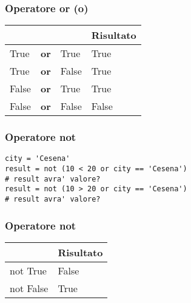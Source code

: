 \begin{frame}[fragile]
\frametitle{Operatore or (o)}

\begin{tabu} to 0.8\textwidth { | X[l] | X[c] | X[c] |  X[r] |}
 \hline
  & & & Risultato\\
 \hline
 True & \textbf{or} & True & True\\
 \hline
 True & \textbf{or} & False & True\\
 \hline
 False & \textbf{or} & True & True\\
\hline
 False & \textbf{or} & False& False\\
\hline
\end{tabu}

\end{frame}

\begin{frame}[fragile]
\frametitle{Operatore not}
    \begin{lstlisting}
city = 'Cesena'
result = not (10 < 20 or city == 'Cesena')
# result avra' valore?
result = not (10 > 20 or city == 'Cesena')
# result avra' valore?
    \end{lstlisting}

\end{frame}

\begin{frame}[fragile]
\frametitle{Operatore not}

\begin{tabu} to 0.8\textwidth { | X[c] |  X[c] |}
 \hline
  & Risultato\\
 \hline
 not True & False\\
 \hline
 not False & True\\
\hline
\end{tabu}

\end{frame}